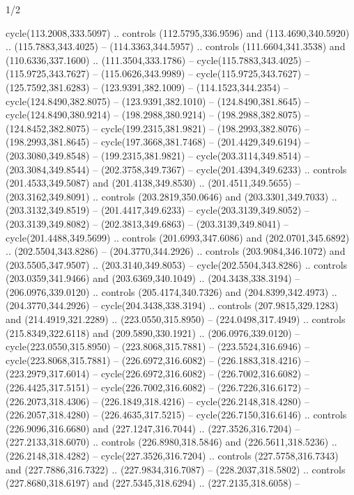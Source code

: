 \begin{flagdescription}{1/2}
\begin{scope}[shift={(0.26984,0.5)},scale=1/2.54]
\begin{scope}[scale=\flagwidth/550]
\begin{scope}
  cycle(113.2008,333.5097) .. controls (112.5795,336.9596) and
  (113.4690,340.5920) .. (115.7883,343.4025) -- (114.3363,344.5957) .. controls
  (111.6604,341.3538) and (110.6336,337.1600) .. (111.3504,333.1786) --
  cycle(115.7883,343.4025) -- (115.9725,343.7627) -- (115.0626,343.9989) --
  cycle(115.9725,343.7627) -- (125.7592,381.6283) -- (123.9391,382.1009) --
  (114.1523,344.2354) -- cycle(124.8490,382.8075) -- (123.9391,382.1010) --
  (124.8490,381.8645) -- cycle(124.8490,380.9214) -- (198.2988,380.9214) --
  (198.2988,382.8075) -- (124.8452,382.8075) -- cycle(199.2315,381.9821) --
  (198.2993,382.8076) -- (198.2993,381.8645) -- cycle(197.3668,381.7468) --
  (201.4429,349.6194) -- (203.3080,349.8548) -- (199.2315,381.9821) --
  cycle(203.3114,349.8514) -- (203.3084,349.8544) -- (202.3758,349.7367) --
  cycle(201.4394,349.6233) .. controls (201.4533,349.5087) and
  (201.4138,349.8530) .. (201.4511,349.5655) -- (203.3162,349.8091) .. controls
  (203.2819,350.0646) and (203.3301,349.7033) .. (203.3132,349.8519) --
  (201.4417,349.6233) -- cycle(203.3139,349.8052) -- (203.3139,349.8082) --
  (202.3813,349.6863) -- (203.3139,349.8041) -- cycle(201.4488,349.5699) ..
  controls (201.6993,347.6086) and (202.0701,345.6892) .. (202.5504,343.8286) --
  (204.3770,344.2926) .. controls (203.9084,346.1072) and (203.5505,347.9507) ..
  (203.3140,349.8053) -- cycle(202.5504,343.8286) .. controls
  (203.0359,341.9466) and (203.6369,340.1049) .. (204.3438,338.3194) --
  (206.0976,339.0120) .. controls (205.4174,340.7326) and (204.8399,342.4973) ..
  (204.3770,344.2926) -- cycle(204.3438,338.3194) .. controls
  (207.9815,329.1283) and (214.4919,321.2289) .. (223.0550,315.8950) --
  (224.0498,317.4949) .. controls (215.8349,322.6118) and (209.5890,330.1921) ..
  (206.0976,339.0120) -- cycle(223.0550,315.8950) -- (223.8068,315.7881) --
  (223.5524,316.6946) -- cycle(223.8068,315.7881) -- (226.6972,316.6082) --
  (226.1883,318.4216) -- (223.2979,317.6014) -- cycle(226.6972,316.6082) --
  (226.7002,316.6082) -- (226.4425,317.5151) -- cycle(226.7002,316.6082) --
  (226.7226,316.6172) -- (226.2073,318.4306) -- (226.1849,318.4216) --
  cycle(226.2148,318.4280) -- (226.2057,318.4280) -- (226.4635,317.5215) --
  cycle(226.7150,316.6146) .. controls (226.9096,316.6680) and
  (227.1247,316.7044) .. (227.3526,316.7204) -- (227.2133,318.6070) .. controls
  (226.8980,318.5846) and (226.5611,318.5236) .. (226.2148,318.4282) --
  cycle(227.3526,316.7204) .. controls (227.5758,316.7343) and
  (227.7886,316.7322) .. (227.9834,316.7087) -- (228.2037,318.5802) .. controls
  (227.8680,318.6197) and (227.5345,318.6294) .. (227.2135,318.6058) --

\end{scope}
\end{scope}
\end{scope}
\end{flagdescription}
